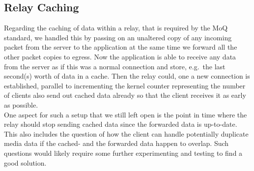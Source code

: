 \subsection{Relay Caching}
Regarding the caching of data within a relay, that is required by the MoQ standard, we handled this 
by passing on an unaltered copy of any incoming packet from the server to the application at the same 
time we forward all the other packet copies to egress.
Now the application is able to receive any data from the server as if this was a normal connection and 
store, e.g.~the last second(s) worth of data in a cache.
Then the relay could, one a new connection is established, parallel to incrementing the kernel counter 
representing the number of clients also send out cached data already so that the client receives it
as early as possible.
\\
One aspect for such a setup that we still left open is the point in time where the relay should stop 
sending cached data since the forwarded data is up-to-date.
This also includes the question of how the client can handle potentially duplicate media data if the 
cached- and the forwarded data happen to overlap.
Such questions would likely require some further experimenting and testing to find a good solution.
